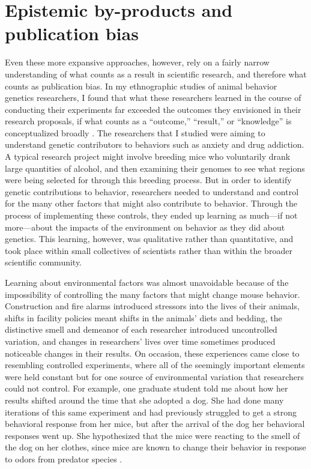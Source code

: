 \documentclass[twocolumn, serif, meta, authordate]{jote-article}
\begin{document}
 {} \section*{Epistemic by-products and publication bias}

Even these more expansive approaches, however, rely on a fairly narrow understanding of what counts as a result in scientific research, and therefore what counts as publication bias. In my ethnographic studies of animal behavior genetics researchers, I found that what these researchers learned in the course of conducting their experiments far exceeded the outcomes they envisioned in their research proposals, if what counts as a ``outcome,'' ``result,'' or ``knowledge'' is conceptualized broadly \parencite{Nelson2018}. The researchers that I studied were aiming to understand genetic contributors to behaviors such as anxiety and drug addiction. A typical research project might involve breeding mice who voluntarily drank large quantities of alcohol, and then examining their genomes to see what regions were being selected for through this breeding process. But in order to identify genetic contributions to behavior, researchers needed to understand and control for the many other factors that might also contribute to behavior. Through the process of implementing these controls, they ended up learning as much---if not more---about the impacts of the environment on behavior as they did about genetics. This learning, however, was qualitative rather than quantitative, and took place within small collectives of scientists rather than within the broader scientific community.

Learning about environmental factors was almost unavoidable because of the impossibility of controlling the many factors that might change mouse behavior. Construction and fire alarms introduced stressors into the lives of their animals, shifts in facility policies meant shifts in the animals' diets and bedding, the distinctive smell and demeanor of each researcher introduced uncontrolled variation, and changes in researchers' lives over time sometimes produced noticeable changes in their results. On occasion, these experiences came close to resembling controlled experiments, where all of the seemingly important elements were held constant but for one source of environmental variation that researchers could not control. For example, one graduate student told me about how her results shifted around the time that she adopted a dog. She had done many iterations of this same experiment and had previously struggled to get a strong behavioral response from her mice, but after the arrival of the dog her behavioral responses went up. She hypothesized that the mice were reacting to the smell of the dog on her clothes, since mice are known to change their behavior in response to odors from predator species \parencite{Apfelbach2005}.
\end{document}
